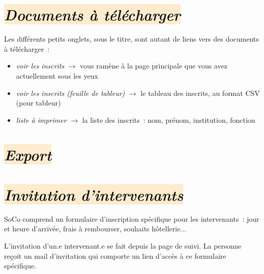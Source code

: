 \documentclass[10pt,a4paper]{article}
\newcommand{\rosepale}[1]{\colorbox{BlanchedAlmond}{#1}}
\begin{document}

\section*{\rosepale{\emph{Documents à télécharger}}}

Les différents petits onglets, sous le titre, sont autant de liens vers des
documents à télécharger :

\begin{itemize}
  \item \emph{voir les inscrits} $\longrightarrow$ vous ramène à la page
    principale que vous avez actuellement sous les yeux
  \item \emph{voir les inscrits (feuille de tableur)} $\longrightarrow$ le tableau des inscrits, au format CSV (pour tableur)
  \item \emph{liste à imprimer} $\longrightarrow$ la liste des inscrits : nom, prénom, institution, fonction
\end{itemize}

\section*{\rosepale{\emph{Export}}}

\section*{\rosepale{\emph{Invitation d'intervenants}}}

SoCo comprend un formulaire d'inscription spécifique pour les intervenants : jour et heure d'arrivée, frais à rembourser, souhaits hôtellerie...

L'invitation d'un.e intervenant.e se fait depuis la page de suivi. La personne reçoit un mail d'invitation qui comporte un lien d'accès à ce formulaire spécifique.

\vspace{1cm}
\hfill

\end{document}
